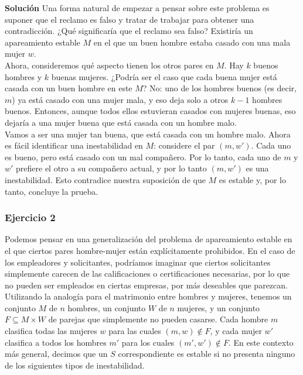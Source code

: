 \documentclass[a4paper]{article}
\begin{document}
\textbf{Solución} Una forma natural de empezar a pensar sobre este problema es suponer que el reclamo es falso y tratar de trabajar para obtener una contradicción. ¿Qué significaría que el reclamo sea falso? Existiría un apareamiento estable $M$ en el que un buen hombre estaba casado con una mala mujer $w$.\\

Ahora, consideremos qué aspecto tienen los otros pares en $M$. Hay $k$ buenos hombres y $k$ buenas mujeres. ¿Podría ser el caso que cada buena mujer está casada con un buen hombre en este $M$? No: uno de los hombres buenos (es decir, $m$) ya está casado con una mujer mala, y eso deja solo a otros $k-1$ hombres buenos. Entonces, aunque todos ellos estuvieran casados con mujeres buenas, eso dejaría a una mujer buena que está casada con un hombre malo.\\

Vamos a ser una mujer tan buena, que está casada con un hombre malo. Ahora es fácil identificar una inestabilidad en $M$: considere el par $(m,w')$. Cada uno es bueno, pero está casado con un mal compañero. Por lo tanto, cada uno de $m$ y $w'$ prefiere el otro a su compañero actual, y por lo tanto $(m,w')$ es una inestabilidad. Esto contradice nuestra suposición de que $M$ es estable y, por lo tanto, concluye la prueba.\\

\subsubsection*{Ejercicio 2}

Podemos pensar en una generalización del problema de apareamiento estable en el que ciertos pares hombre-mujer están explícitamente prohibidos. En el caso de los empleadores y solicitantes, podríamos imaginar que ciertos solicitantes simplemente carecen de las calificaciones o certificaciones necesarias, por lo que no pueden ser empleados en ciertas empresas, por más deseables que parezcan. Utilizando la analogía para el matrimonio entre hombres y mujeres, tenemos un conjunto $M$ de $n$ hombres, un conjunto $W$ de $n$ mujeres, y un conjunto $F⊆M×W$ de parejas que simplemente no pueden casarse. Cada hombre $m$ clasifica todas las mujeres $w$ para las cuales $(m,w)∉F$, y cada mujer $w'$ clasifica a todos los hombres $m'$ para los cuales $(m',w')∉F$. En este contexto más general, decimos que un $S$ correspondiente es estable si no presenta ninguno de los siguientes tipos de inestabilidad.\\
\end{document}
